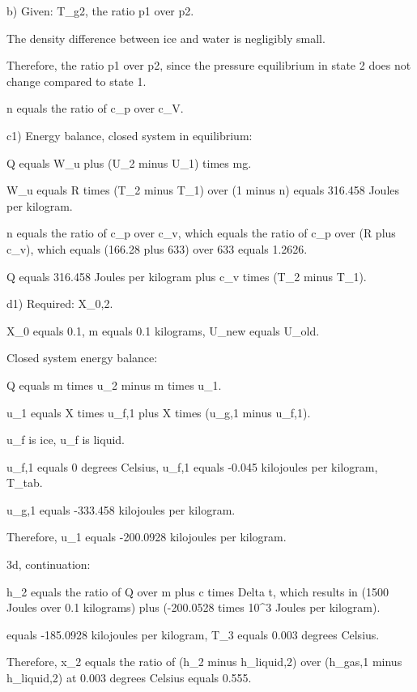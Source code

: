 b) Given: T_g2, the ratio p1 over p2.

The density difference between ice and water is negligibly small.

Therefore, the ratio p1 over p2, since the pressure equilibrium in state 2 does not change compared to state 1.

n equals the ratio of c_p over c_V.

c1) Energy balance, closed system in equilibrium:

Q equals W_u plus (U_2 minus U_1) times mg.

W_u equals R times (T_2 minus T_1) over (1 minus n) equals 316.458 Joules per kilogram.

n equals the ratio of c_p over c_v, which equals the ratio of c_p over (R plus c_v), which equals (166.28 plus 633) over 633 equals 1.2626.

Q equals 316.458 Joules per kilogram plus c_v times (T_2 minus T_1).

d1) Required: X_0,2.

X_0 equals 0.1, m equals 0.1 kilograms, U_new equals U_old.

Closed system energy balance:

Q equals m times u_2 minus m times u_1.

u_1 equals X times u_f,1 plus X times (u_g,1 minus u_f,1).

u_f is ice, u_f is liquid.

u_f,1 equals 0 degrees Celsius, u_f,1 equals -0.045 kilojoules per kilogram, T_tab.

u_g,1 equals -333.458 kilojoules per kilogram.

Therefore, u_1 equals -200.0928 kilojoules per kilogram.

3d, continuation:

h_2 equals the ratio of Q over m plus c times Delta t, which results in (1500 Joules over 0.1 kilograms) plus (-200.0528 times 10^3 Joules per kilogram).

equals -185.0928 kilojoules per kilogram, T_3 equals 0.003 degrees Celsius.

Therefore, x_2 equals the ratio of (h_2 minus h_liquid,2) over (h_gas,1 minus h_liquid,2) at 0.003 degrees Celsius equals 0.555.